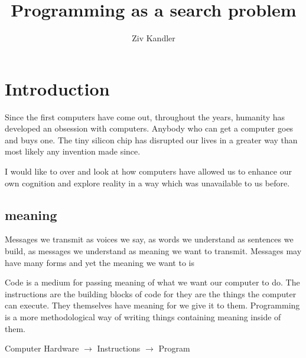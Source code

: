 \documentclass[a4paper]{article}
\title{\Huge{Programming as a search problem}}
\author{Ziv Kandler}
\begin{document}
\section{Introduction}
Since the first computers have come out, throughout the years, humanity has
developed an obsession with computers. Anybody who can get a computer goes and
buys one. The tiny silicon chip has disrupted our lives in a greater way than
most likely any invention made since.

I would like to over and look at how computers have allowed us to enhance our
own cognition and explore reality in a way which was unavailable to us before.





\subsection{meaning}

Messages we transmit as voices we say, as words we understand as sentences we
build, as messages we understand as meaning we want to transmit.
Messages may have many forms and yet the meaning we want to is 

Code is a medium for passing meaning of what we want our computer to do. The
instructions are the building blocks of code for they are the things the
computer can execute. They themselves have meaning for we give it to them.
Programming is a more methodological way of writing things containing meaning
inside of them.  


Computer Hardware $\to$ Instructions $\to$ Program
\end{document}
